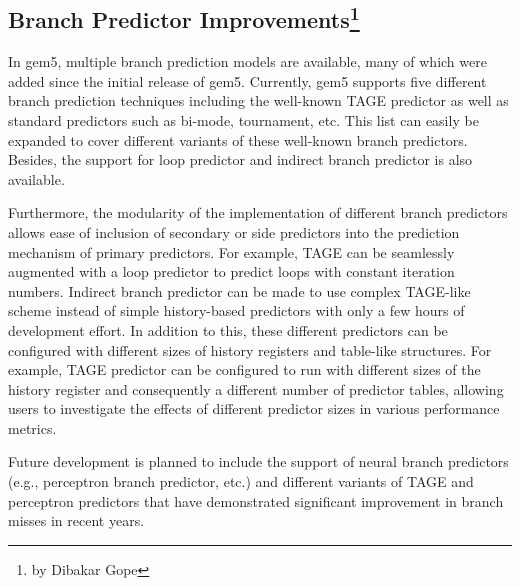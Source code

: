 \subsection[Branch Predictor Improvements]{Branch Predictor Improvements\footnote{by Dibakar Gope}}

In gem5, multiple branch prediction models are available, many of which were added since the initial release of gem5.
Currently, gem5 supports five different branch prediction techniques including the well-known TAGE predictor as well as standard predictors such as bi-mode, tournament, etc.
This list can easily be expanded to cover different variants of these well-known branch predictors.
Besides, the support for loop predictor and indirect branch predictor is also available.

Furthermore, the modularity of the implementation of different branch predictors allows ease of inclusion of secondary or side predictors into the prediction mechanism of primary predictors.
For example, TAGE can be seamlessly augmented with a loop predictor to predict loops with constant iteration numbers.
Indirect branch predictor can be made to use complex TAGE-like scheme instead of simple history-based predictors with only a few hours of development effort.
In addition to this, these different predictors can be configured with different sizes of history registers and table-like structures.
For example, TAGE predictor can be configured to run with different sizes of the history register and consequently a different number of predictor tables, allowing users to investigate the effects of different predictor sizes in various performance metrics.

Future development is planned to include the support of neural branch predictors (e.g., perceptron branch predictor, etc.) and different variants of TAGE and perceptron predictors that have demonstrated significant improvement in branch misses in recent years.
